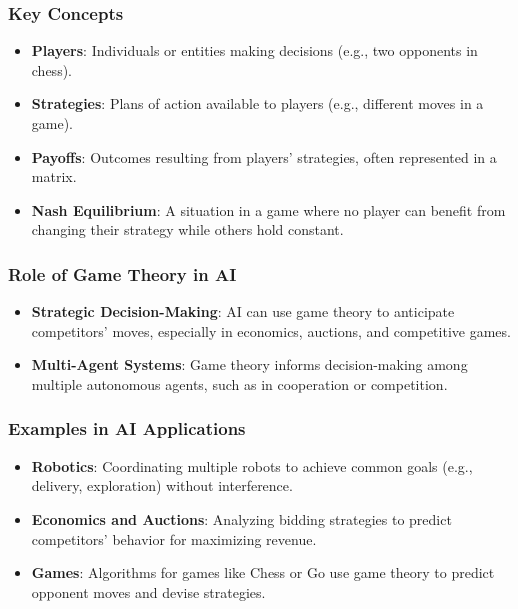\documentclass[aspectratio=169]{beamer}
\begin{document}
\begin{frame}[fragile]
    \frametitle{Key Concepts}
    \begin{itemize}
        \item \textbf{Players}: Individuals or entities making decisions (e.g., two opponents in chess).
        \item \textbf{Strategies}: Plans of action available to players (e.g., different moves in a game).
        \item \textbf{Payoffs}: Outcomes resulting from players' strategies, often represented in a matrix.
        \item \textbf{Nash Equilibrium}: A situation in a game where no player can benefit from changing their strategy while others hold constant.
    \end{itemize}
\end{frame}

\begin{frame}[fragile]
    \frametitle{Role of Game Theory in AI}
    \begin{itemize}
        \item \textbf{Strategic Decision-Making}: AI can use game theory to anticipate competitors' moves, especially in economics, auctions, and competitive games.
        
        \item \textbf{Multi-Agent Systems}: Game theory informs decision-making among multiple autonomous agents, such as in cooperation or competition.
    \end{itemize}
\end{frame}

\begin{frame}[fragile]
    \frametitle{Examples in AI Applications}
    \begin{itemize}
        \item \textbf{Robotics}: Coordinating multiple robots to achieve common goals (e.g., delivery, exploration) without interference.
        
        \item \textbf{Economics and Auctions}: Analyzing bidding strategies to predict competitors' behavior for maximizing revenue.
        
        \item \textbf{Games}: Algorithms for games like Chess or Go use game theory to predict opponent moves and devise strategies.
    \end{itemize}
\end{frame}
\end{document}
